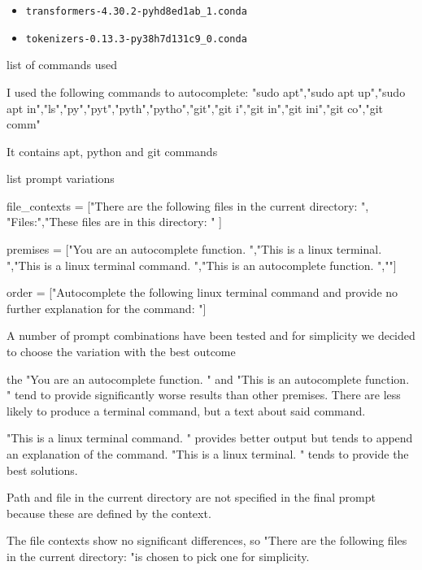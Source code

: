 \begin{itemize}
\item \begin{verbatim}
transformers-4.30.2-pyhd8ed1ab_1.conda
\end{verbatim}

\item \begin{verbatim}
tokenizers-0.13.3-py38h7d131c9_0.conda
\end{verbatim}
  
\end{itemize}






list of commands used

I used the following commands to autocomplete:
"sudo apt","sudo apt up","sudo apt in","ls","py","pyt","pyth","pytho","git","git i","git in","git ini","git co","git comm"

It contains apt, python and git commands



list prompt variations

file_contexts = ["There are the following files in the current  directory: ", "Files:","These files are in this directory: " ]

premises = ["You are an autocomplete function. ","This is a linux terminal. ","This is a linux terminal command. ","This is an autocomplete function. ",""]

order = ["Autocomplete the following linux terminal command and provide no further explanation for the command: "]
 

A number of prompt combinations have been tested and for simplicity we decided to choose the variation with the best outcome 


the "You are an autocomplete function. " and "This is an autocomplete function. " tend to provide significantly worse results than other premises. There are less likely to produce a terminal command, but a text about said command.

"This is a linux terminal command. " provides better output but tends to append an explanation of the command. "This is a linux terminal. " tends to provide the best solutions. 



Path and file in the current directory are not specified in the final prompt because these are defined by the context.


The file contexts show no significant differences, so "There are the following files in the current  directory: "is chosen to pick one for simplicity.



